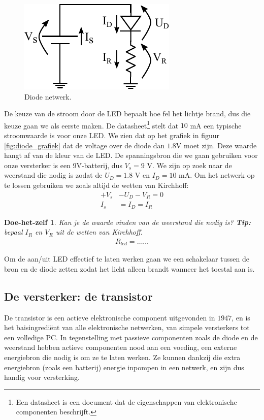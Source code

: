 \documentclass{article}
\newtheorem{DIY}{Doe-het-zelf}
\begin{document}
			\begin{figure}[htbp]
				\centering
				\includegraphics{diode_netwerk}
				\caption{Diode netwerk.}
				\label{fig:diode_netwerk}
			\end{figure}

			De keuze van de stroom door de LED bepaalt hoe fel het lichtje brand, dus die keuze gaan we als eerste maken. De datasheet\footnote{Een datasheet is een document dat de eigenschappen van elektronische componenten beschrijft.} stelt dat $10$ mA een typische stroomwaarde is voor onze LED. We zien dat op het grafiek in figuur \ref{fig:diode_grafiek} dat de voltage over de diode dan $1.8 $V moet zijn. Deze waarde hangt af van de kleur van de LED. De spanningsbron die we gaan gebruiken voor onze versterker is een 9V-batterij, dus $V_s = 9$ V. We zijn op zoek naar de weerstand die nodig is zodat de $U_D = 1.8$ V en $I_D =10$ mA. Om het netwerk op te lossen gebruiken we zoals altijd de wetten van Kirchhoff:
			\begin{align}
				+V_s &- U_D - V_R = 0  \\
				I_s &= I_D = I_R
			\end{align}

			\begin{DIY} Kan je de waarde vinden van de weerstand die nodig is? \textbf{Tip:} bepaal $I_R$ en $V_R$ uit de wetten van Kirchhoff.
			\begin{align*}
			    R_{led} = \ldots\ldots
			\end{align*}
			\end{DIY}

			Om de aan/uit LED effectief te laten werken gaan we een schakelaar tussen de bron en de diode zetten zodat het licht alleen brandt wanneer het toestal aan is.

		\subsection{De versterker: de transistor}
			De transistor is een actieve elektronische component uitgevonden in $1947$, en is het baisingredi\"ent van alle elektronische netwerken, van simpele versterkers tot een volledige PC. In tegenstelling met passieve componenten zoals de diode en de weerstand hebben actieve componenten nood aan een voeding, een externe energiebron die nodig is om ze te laten werken. Ze kunnen dankzij die extra energiebron (zoals een batterij) energie inpompen in een netwerk, en zijn dus handig voor versterking.
\end{document}
